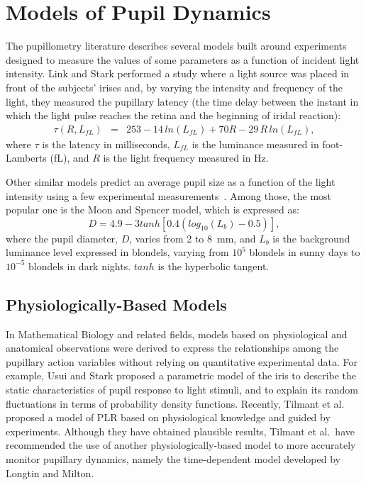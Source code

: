 \documentclass{acmtog} %
\begin{document}
\section{Models of Pupil Dynamics}
\label{sub:models_of_pupil_dynamics}

The pupillometry literature describes several models built around
experiments designed to measure the values of some parameters as a
function of incident light intensity. Link and Stark performed a study
where a light source was placed in front of the subjects' irises and, by
varying the intensity and frequency of the light, they measured the
pupillary latency (the time delay between the instant in which the light
pulse reaches the retina and the beginning of iridal reaction):
\begin{eqnarray}
  \tau(R,L_{fL}) & = & 253 - 14\,{{ln}}(L_{fL}) + 70 R - 29\, R\, {{ln}}(L_{fL}),
  \label{eq:Link_n_Stark}
\end{eqnarray}
where $\tau$ is the latency in milliseconds, $L_{fL}$ is the luminance
measured in foot-Lamberts (fL), and $R$ is the light frequency measured
in Hz.

Other similar models predict an average pupil size as a function of the
light intensity using a few experimental measurements~\cite{DC-1901}.
Among those, the most popular one is the Moon and Spencer model, which
is expressed as:
\begin{equation}
\label{eq:moon}
 D = 4.9 - 3 {{tanh}}[0.4 ({{log}}_{10}(L_{b}) - 0.5)],
\end{equation}
where the pupil diameter, $D$, varies from 2 to 8~mm, and $L_{b}$ is the
background luminance level expressed in blondels, varying from $10^5$
blondels in sunny days to $10^{-5}$ blondels in dark nights. $tanh$ is
the hyperbolic tangent.

\subsection{Physiologically-Based Models}
\label{subsub:theoretical_models}
%
In Mathematical Biology and related fields, models based on
physiological and anatomical observations were derived to express the
relationships among the pupillary action variables without relying on
quantitative experimental data. For example, Usui and Stark proposed a
parametric model of the iris to describe the static characteristics of
pupil response to light stimuli, and to explain its random fluctuations
in terms of probability density functions. Recently, Tilmant {et al.}
proposed a model of PLR based on physiological knowledge and guided by
experiments. Although they have obtained plausible results, Tilmant {et
al.}\ have recommended the use of another physiologically-based model to
more accurately monitor pupillary dynamics, namely the time-dependent
model developed by Longtin and Milton.
\end{document}
